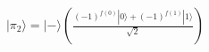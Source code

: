 \documentclass[preview]{standalone}
\begin{document}
\begin{align*}
|\pi_2\rangle = |-\rangle \left( \frac{(-1)^{f(0)} |0\rangle + (-1)^{f(1)}|1\rangle}{\sqrt{2}} \right)
\end{align*}
\end{document}
